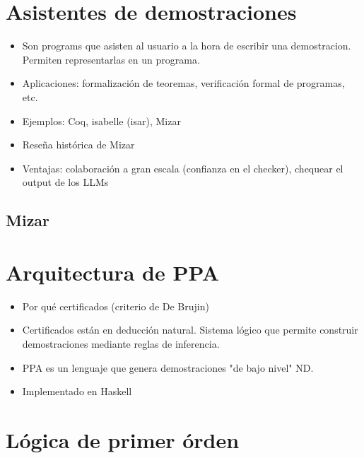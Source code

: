 \section{Asistentes de demostraciones}

\begin{itemize}
    \item Son programs que asisten al usuario a la hora de escribir una
    demostracion. Permiten representarlas en un programa.
    \item Aplicaciones: formalización de teoremas, verificación formal de
    programas, etc.
    \item Ejemplos: Coq, isabelle (isar), Mizar
    \item Reseña histórica de Mizar
    \item Ventajas: colaboración a gran escala (confianza en el checker),
    chequear el output de los LLMs
\end{itemize}

\subsection{Mizar}


\section{Arquitectura de PPA}

\begin{itemize}
    \item Por qué certificados (criterio de De Brujin)
    \item Certificados están en deducción natural. Sistema lógico que permite
    construir demostraciones mediante reglas de inferencia.
    \item PPA es un lenguaje que genera demostraciones "de bajo nivel" ND.
    \item Implementado en Haskell
\end{itemize}

\section{Lógica de primer órden}

